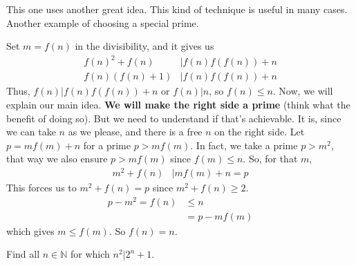 \documentclass[problems.tex]{subfile}
\begin{document}
	\begin{solution}[Second]
		This one uses another great idea. This kind of technique is useful in many cases. Another example of choosing a special prime.
		
		Set $m=f(n)$ in the divisibility, and it gives us
		\begin{align*}
		f(n)^2+f(n) & |f(n)f(f(n))+n\\
		f(n)(f(n)+1)& | f(n)f(f(n))+n
		\end{align*}
		Thus, $f(n)|f(n)f(f(n))+n$ or $f(n)|n$, so $f(n)\leq n$. Now, we will explain our main idea. \textbf{We will make the right side a prime} (think what the benefit of doing so). But we need to understand if that's achievable. It is, since we can take $n$ as we please, and there is a free $n$ on the right side. Let $p=mf(m)+n$ for a prime $p>mf(m)$. In fact, we take a prime $p>m^2$, that way we also ensure $p>mf(m)$ since $f(m)\leq n$. So, for that $m$,
			\begin{align*}
				m^2+f(n) & |mf(m)+n=p
			\end{align*}
		This forces us to $m^2+f(n)=p$ since $m^2+f(n)\geq2$.
			\begin{align*}
				p-m^2 = f(n) & \leq n\\
							 & = p-mf(m)
			\end{align*}
		which gives $m\leq f(m)$. So $f(n)=n$.
	\end{solution}
	
	\begin{problem}
		Find all $n\in\mathbb{N}$ for which $n^2|2^n+1$.
	\end{problem}
	
\end{document}
